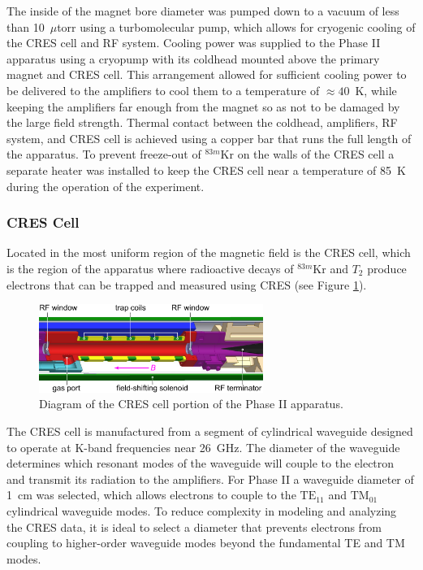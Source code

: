 The inside of the magnet bore diameter was pumped down to a vacuum of less than 10~$\mu$torr using a turbomolecular pump, which allows for cryogenic cooling of the CRES cell and RF system. Cooling power was supplied to the Phase II apparatus using a cryopump with its coldhead mounted above the primary magnet and CRES cell. This arrangement allowed for sufficient cooling power to be delivered to the amplifiers to cool them to a temperature of $\approx 40$~K, while keeping the amplifiers far enough from the magnet so as not to be damaged by the large field strength. Thermal contact between the coldhead, amplifiers, RF system, and CRES cell is achieved using a copper bar that runs the full length of the apparatus. To prevent freeze-out of $^{83m}$Kr on the walls of the CRES cell a separate heater was installed to keep the CRES cell near a temperature of 85~K during the operation of the experiment.

\subsubsection*{CRES Cell}

Located in the most uniform region of the magnetic field is the CRES cell, which is the region of the apparatus where radioactive decays of $^{83m}$Kr and $T_2$ produce electrons that can be trapped and measured using CRES (see Figure \ref{fig:chap3-cres-cell}).
\begin{figure}[htbp]
    \centering
    \includegraphics*[width=0.65\textwidth]{figs/Chapter-3/apparatus.pdf}
    \caption{\label{fig:chap3-cres-cell} Diagram of the CRES cell portion of the Phase II apparatus.}
\end{figure}
The CRES cell is manufactured from a segment of cylindrical waveguide designed to operate at K-band frequencies near 26~GHz. The diameter of the waveguide determines which resonant modes of the waveguide will couple to the electron and transmit its radiation to the amplifiers. For Phase II a waveguide diameter of 1~cm was selected, which allows electrons to couple to the $\mathrm{TE}_{11}$ and $\mathrm{TM}_{01}$ cylindrical waveguide modes. To reduce complexity in modeling and analyzing the CRES data, it is ideal to select a diameter that prevents electrons from coupling to higher-order waveguide modes beyond the fundamental TE and TM modes. 

